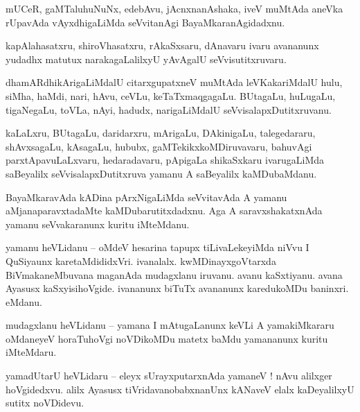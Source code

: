 \documentclass{article}
\begin{document}
\begin{mn}%
mUCeR, gaMTaluhuNuNx, edebAvu, jAcnxnanAshaka, iveV muMtAda aneVka rUpavAda vAyxdhigaLiMda 
seVvitanAgi BayaMkaranAgidadxnu.
\end{mn}

\begin{mn}%
kapAlahasatxru, shiroVhasatxru, rAkaSxsaru, dAnavaru ivaru avananunx yudadhx matutux 
narakagaLalilxyU yAvAgalU seVvisutitxruvaru.
\end{mn}

\begin{mn}%
dhamARdhikArigaLiMdalU citarxgupatxneV muMtAda leVKakariMdalU hulu, siMha, haMdi, nari, hAvu, 
ceVLu, keTaTxmaqgagaLu. BUtagaLu, huLugaLu, tigaNegaLu, toVLa, nAyi, hadudx, narigaLiMdalU 
seVvisalapxDutitxruvanu.
\end{mn}

\begin{mn}%
kaLaLxru, BUtagaLu, daridarxru, mArigaLu, DAkinigaLu, talegedararu, shAvxsagaLu, kAsagaLu, hububx, 
gaMTekikxkoMDiruvavaru, bahuvAgi parxtApavuLaLxvaru, hedaradavaru, pApigaLa shikaSxkaru 
ivarugaLiMda saBeyalilx seVvisalapxDutitxruva yamanu A saBeyalilx kaMDubaMdanu.
\end{mn}

\begin{mn}%
BayaMkaravAda kADina pArxNigaLiMda seVvitavAda A yamanu aMjanaparavxtadaMte kaMDubarutitxdadxnu. 
Aga A saravxshakatxnAda yamanu seVvakaranunx kuritu iMteMdanu.
\end{mn}

\begin{mn}%
yamanu heVLidanu -- oMdeV hesarina tapupx tiLivaLekeyiMda niVvu I QuSiyaunx karetaMdididxVri. 
ivanalalx. kwMDinayxgoVtarxda BiVmakaneMbuvana maganAda mudagxlanu iruvanu. avanu kaSxtiyanu. 
avana Ayasusx kaSxyisihoVgide. ivananunx biTuTx avananunx karedukoMDu baninxri. eMdanu.
\end{mn}

\begin{mn}%
mudagxlanu heVLidanu -- yamana I mAtugaLanunx keVLi A yamakiMkararu oMdaneyeV horaTuhoVgi 
noVDikoMDu matetx baMdu yamananunx kuritu iMteMdaru.
\end{mn}

\begin{mn}%
yamadUtarU heVLidaru -- eleyx sUrayxputarxnAda yamaneV ! nAvu alilxger hoVgidedxvu. alilx Ayasusx 
tiVridavanobabxnanUnx kANaveV elalx kaDeyalilxyU sutitx noVDidevu.
\end{mn}
\end{document}
